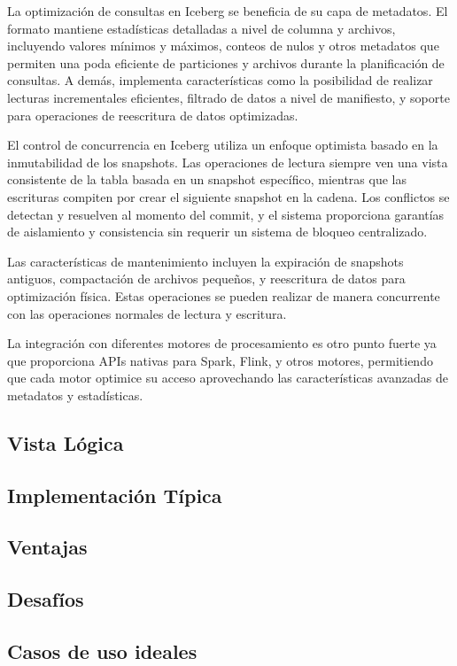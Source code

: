 La optimización de consultas en Iceberg se beneficia de su capa de metadatos. 
El formato mantiene estadísticas detalladas a nivel de columna y archivos, 
incluyendo valores mínimos y máximos, conteos de nulos y otros metadatos que permiten una poda eficiente de particiones 
y archivos durante la planificación de consultas. A
demás, implementa características como la posibilidad de realizar lecturas incrementales eficientes, 
filtrado de datos a nivel de manifiesto, y soporte para operaciones de reescritura de datos optimizadas.

El control de concurrencia en Iceberg utiliza un enfoque optimista basado en la inmutabilidad de los snapshots. 
Las operaciones de lectura siempre ven una vista consistente de la tabla basada en un snapshot específico, 
mientras que las escrituras compiten por crear el siguiente snapshot en la cadena. 
Los conflictos se detectan y resuelven al momento del commit, y el sistema proporciona garantías de aislamiento y consistencia 
sin requerir un sistema de bloqueo centralizado.

Las características de mantenimiento incluyen la expiración de snapshots antiguos, compactación de archivos pequeños, 
y reescritura de datos para optimización física. 
Estas operaciones se pueden realizar de manera concurrente con las operaciones normales de lectura y escritura.

La integración con diferentes motores de procesamiento es otro punto fuerte ya que proporciona APIs nativas para Spark, Flink, y otros motores, 
permitiendo que cada motor optimice su acceso aprovechando las características avanzadas de metadatos y estadísticas.

\subsection{Vista Lógica}



\subsection{Implementación Típica}

\subsection{Ventajas}

\subsection{Desafíos}



\subsection{Casos de uso ideales}
